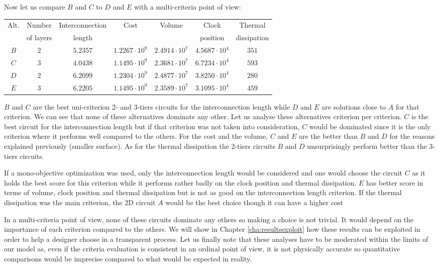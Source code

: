 Now let us compare $B$ and $C$ to $D$ and $E$ with a multi-criteria point of view:
\begin{center}
\begin{footnotesize}
\begin{tabular}{c|c|ccccc}
Alt. & Number & Interconnection & Cost & Volume & Clock & Thermal\\
 & of layers & length & & & position & dissipation\\
\hline
$B$ & $2$ & $5.2357$ & $1.2267\cdot10^9$ & $2.4914\cdot 10^7$ & $4.5687\cdot 10^4$ & $351$ \\
$C$ & $3$ & $4.0438$ & $1.1495\cdot10^9$ & $2.3681\cdot 10^7$ & $6.7234\cdot 10^4$ & $593$ \\
$D$ & $2$ & $6.2099$ & $1.2304\cdot10^9$ & $2.4877\cdot 10^7$ & $3.8250\cdot 10^4$ & $280$ \\
$E$ & $3$ & $6.2205$ & $1.1495\cdot10^9$ & $2.3589\cdot 10^7$ & $3.1095\cdot 10^4$ & $459$ \\
\end{tabular}
\end{footnotesize}
\end{center}
$B$ and $C$ are the best uni-criterion 2- and 3-tiers circuits for the interconnection length while $D$ and $E$ are solutions close to $A$ for that criterion. We can see that none of these alternatives dominate any other. Let us analyse these alternatives criterion per criterion. $C$ is the best circuit for the interconnection length but if that criterion was not taken into consideration, $C$ would be dominated since it is the only criterion where it performs well compared to the others. For the cost and the volume, $C$ and $E$ are the better than $B$ and $D$ for the reasons explained previously (smaller surface). As for the thermal dissipation the 2-tiers circuits $B$ and $D$ unsurprisingly perform better than the 3-tiers circuits. 

If a mono-objective optimization was used, only the interconnection length would be considered and one would choose the circuit $C$ as it holds the best score for this criterion while it performs rather badly on the clock position and thermal dissipation. $E$ has better score in terms of volume, clock position and thermal dissipation but is not as good on the interconnection length criterion. If the thermal dissipation was the main criterion, the 2D circuit $A$ would be the best choice though it can have a higher cost

In a multi-criteria point of view, none of these circuits dominate any others so making a choice is not trivial. It would depend on the importance of each criterion compared to the others. We will show in Chapter \ref{cha:resultsexploit} how these results can be exploited in order to help a designer choose in a transparent process. Let us finally note that these analyses have to be moderated within the limits of our model as, even if the criteria evaluation is consistent in an ordinal point of view, it is not physically accurate so quantitative comparisons would be imprecise compared to what would be expected in reality.

